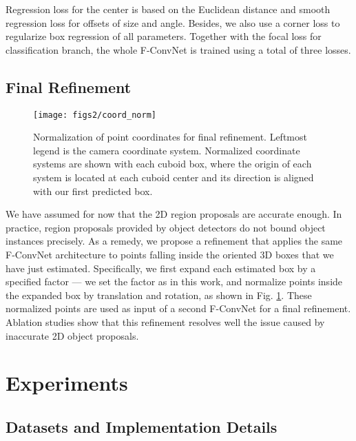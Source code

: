 \documentclass[letterpaper, 10 pt, conference]{ieeeconf}
\begin{document}
Regression loss for the center is based on the Euclidean distance and smooth  regression loss for offsets of size and angle. Besides, we also use a corner loss \cite{qi2018frustum} to regularize box regression of all parameters. Together with the focal loss for classification branch, the whole F-ConvNet is trained using a total of three losses.

\subsection{Final Refinement}

\begin{figure}
	\begin{center}
	\texttt{[image: figs2/coord\_norm]}
	\caption[]{Normalization of point coordinates for final refinement. Leftmost legend is the camera coordinate system. Normalized coordinate systems are shown with each cuboid box, where the origin of each system is located at each cuboid center and its direction is aligned with our first predicted box. }
	\label{Fig:coordnorm}
	\end{center}
	\vspace{-0.5cm}
\end{figure}

We have assumed for now that the 2D region proposals are accurate enough. In practice, region proposals provided by object detectors do not bound object instances precisely. As a remedy, we propose a refinement that applies the same F-ConvNet architecture to points falling inside the oriented 3D boxes that we have just estimated. Specifically, we first expand each estimated box by a specified factor --- we set the factor as  in this work, and normalize points inside the expanded box by translation and rotation, as shown in Fig. \ref{Fig:coordnorm}. These normalized points are used as input of a second F-ConvNet for a final refinement. Ablation studies show that this refinement resolves well the issue caused by inaccurate 2D object proposals.

\section{Experiments}
\subsection{Datasets and Implementation Details}
\end{document}

